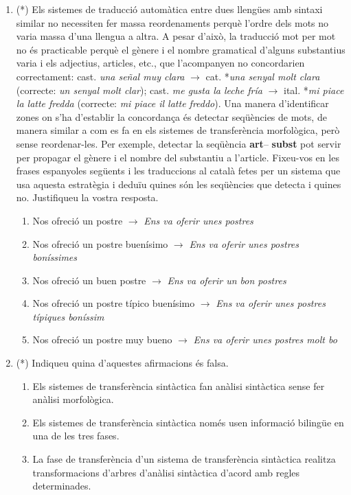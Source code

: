 \begin{enumerate}
\item (*) \label{ex:postres} Els sistemes de traducció automàtica
  entre dues llengües amb sintaxi similar no necessiten fer massa
  reordenaments perquè l'ordre dels mots no varia massa d'una llengua
  a altra. A pesar d'això, la traducció mot per mot no és practicable
  perquè el gènere i el nombre gramatical d'alguns substantius varia i
  els adjectius, articles, etc., que l'acompanyen no concordarien
  correctament: cast. {\em una señal muy clara\/} $\rightarrow$
  cat. *{\em una senyal molt clara} (correcte: {\em un senyal molt
    clar\/}); cast. {\em me gusta la leche fría} $\rightarrow$
  ital. *{\em mi piace la latte fredda\/} (correcte: {\em mi piace il
    latte freddo}). Una manera d'identificar zones on s'ha d'establir
  la concordança és detectar seqüències de mots, de manera similar a
  com es fa en els sistemes de transferència morfològica, però sense
  reordenar-les. Per exemple, detectar la seqüència {\bf art}--{\bf
    subst} pot servir per propagar el gènere i el nombre del
  substantiu a l'article. Fixeu-vos en les frases espanyoles següents
  i les traduccions al català fetes per un sistema que usa aquesta
  estratègia i deduïu quines són les seqüències que detecta i quines
  no. Justifiqueu la vostra resposta.
  \begin{enumerate}
  \item {\sf Nos ofreció un postre} $\rightarrow$ {\em Ens va oferir
      unes postres\/}
  \item {\sf Nos ofreció un postre buenísimo} $\rightarrow$ {\em Ens
      va oferir unes postres boníssimes\/}
  \item {\sf Nos ofreció un buen postre} $\rightarrow$ {\em *Ens va
      oferir un bon postres\/}
  \item {\sf Nos ofreció un postre típico buenísimo\/} $\rightarrow$
    {\em *Ens va oferir unes postres típiques boníssim\/}
  \item {\sf Nos ofreció un postre muy bueno} $\rightarrow$ {\em *Ens
      va oferir unes postres molt bo\/}
  \end{enumerate}

\item (*) Indiqueu quina d'aquestes afirmacions és falsa.   
  \begin{enumerate}
  \item Els sistemes de transferència sintàctica fan anàlisi
    sintàctica sense fer anàlisi morfològica.
  \item Els sistemes de transferència sintàctica només usen informació
    bilingüe en una de les tres fases.
  \item La fase de transferència d'un sistema de transferència
    sintàctica realitza transformacions d'arbres d'anàlisi sintàctica
    d'acord amb regles determinades.
  \end{enumerate}


\end{enumerate}
